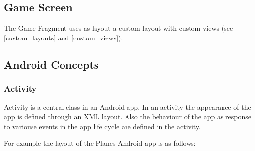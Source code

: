 \subsection{Game Screen}

The Game Fragment uses as layout a custom layout with custom views (see \ref{custom_layouts} and \ref{custom_views}).


\subsection { Android Concepts }

\subsubsection { Activity }

Activity is a central class in an Android app. In an activity the appearance of the app is defined through an XML layout. Also the behaviour of the app as response to variouse events in the app life cycle are defined in the activity.

For example the layout of the Planes Android app is as follows:

